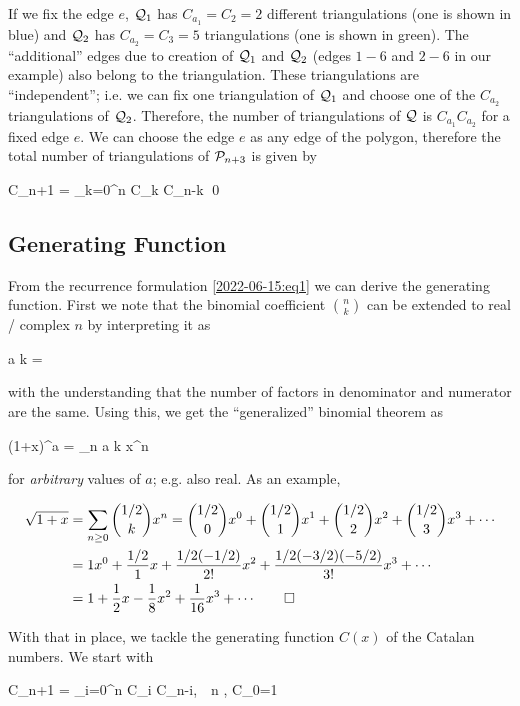 If we fix the edge $e$, $\mathcal{Q}_1$ has $C_{a_1}= C_2=2$ different triangulations (one is shown in blue) and $\mathcal{Q}_2$ has $C_{a_2}= C_3 = 5$ triangulations (one is shown in green). The ``additional'' edges due to creation of $\mathcal{Q}_1$ and $\mathcal{Q}_2$ (edges $1-6$ and $2-6$ in our example) also belong to the triangulation. These triangulations are ``independent''; i.e. we can fix one triangulation of $\mathcal{Q}_1$ and choose one of the $C_{a_2}$ triangulations of $\mathcal{Q}_2$. Therefore, the number of triangulations of $\mathcal{Q}$ is $C_{a_1} C_{a_2}$ for a fixed edge $e$. We can choose the edge $e$ as any edge of the polygon, therefore the total number of triangulations of $\mathcal{P}_{n+3}$ is given by

\bee
C_{n+1} = \sum_{k=0}^n C_k C_{n-k} \qed
\eee


\subsection{Generating Function}

From the recurrence formulation \eqref{2022-06-15:eq1} we can derive the generating function. First we note that the binomial coefficient ${n \choose k}$ can be extended to real / complex $n$ by interpreting it as

\bee
{a \choose k} = 
\eee

with the understanding that the number of factors in denominator and numerator are the same. Using this, we get the ``generalized'' binomial theorem as

\bee
(1+x)^a = \sum_{n } {a \choose k} x^n
\eee

for \emph{arbitrary} values of $a$; e.g. also real. As an example,

\begin{align*}
  \sqrt{1+x} &= \sum_{n \geq 0} {1/2 \choose k} x^n = {1/2 \choose 0} x^0 + {1/2 \choose 1} x^1 + {1/2 \choose 2} x^2 + {1/2 \choose 3} x^3 + \cdots \\
             &= 1 x^0 + \frac{1/2}{1}x + \frac{1/2 (-1/2)}{2!}x^2 + \frac{1/2 (-3/2) (-5/2)}{3!}x^3 + \cdots \\
             &= 1 + \frac{1}{2}x - \frac{1}{8}x^2 + \frac{1}{16}x^3 + \cdots \qed
\end{align*}

With that in place, we tackle the generating function $C(x)$ of the Catalan numbers. We start with

\bee
C_{n+1} = \sum_{i=0}^n C_i C_{n-i}, \,\, n , \quad C_0=1
\eee

